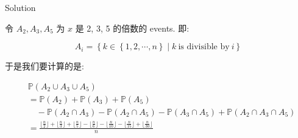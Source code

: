 \begin{qlsolution}{Solution}

令 \(\mathit{A}_{2},\mathit{A}_{3},\mathit{A}_{5}\) 为 \(\mathit{x}\) 是 2, 3, 5 的倍数的 events. 即:

\[\mathit{A}_{\mathit{i}} = \left\{ {\mathit{k} \in \left\{ {1,2,\cdots,\mathit{n}} \right\} \mid \mathit{k}\ \text{is divisible by}\ \mathit{i}} \right\}\]

于是我们要计算的是:

\[\begin{aligned}
 & \mathbb{P}(\mathit{A}_{2} \cup \mathit{A}_{3} \cup \mathit{A}_{5}) \\
 & = \mathbb{P}(\mathit{A}_{2}) + \mathbb{P}(\mathit{A}_{3}) + \mathbb{P}(\mathit{A}_{5}) \\
 &\quad - \mathbb{P}(\mathit{A}_{2} \cap \mathit{A}_{3}) - \mathbb{P}(\mathit{A}_{2} \cap \mathit{A}_{5}) - \mathbb{P}(\mathit{A}_{3} \cap \mathit{A}_{5}) + \mathbb{P}(\mathit{A}_{2} \cap \mathit{A}_{3} \cap \mathit{A}_{5}) \\
 & = \frac{\lfloor\frac{\mathit{n}}{2}\rfloor + \lfloor\frac{\mathit{n}}{3}\rfloor + \lfloor\frac{\mathit{n}}{5}\rfloor - \lfloor\frac{\mathit{n}}{6}\rfloor - \lfloor\frac{\mathit{n}}{10}\rfloor - \lfloor\frac{\mathit{n}}{15}\rfloor + \lfloor\frac{\mathit{n}}{30}\rfloor}{\mathit{n}}
\end{aligned}\]

\end{qlsolution}

